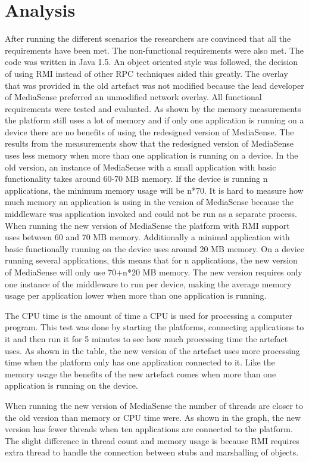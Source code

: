 \section{Analysis}
After running the different scenarios the researchers are convinced that all the requirements have been met. The non-functional requirements were also met. The code was written in Java 1.5. An object oriented style was followed, the decision of using RMI instead of other RPC techniques aided this greatly. The overlay that was provided in the old artefact was not modified because the lead developer of MediaSense preferred an unmodified network overlay. All functional requirements were tested and evaluated. As shown by the memory measurements the platform still uses a lot of memory and if only one application is running on a device there are no benefits of using the redesigned version of MediaSense. The results from the measurements show that the redesigned version of MediaSense uses less memory when more than one application is running on a device. In the old version, an instance of MediaSense with a small application with basic functionality takes around 60-70 MB memory. If the device is running n applications, the minimum memory usage will be n*70. It is hard to measure how much memory an application is using in the version of MediaSense because the middleware was application invoked and could not be run as a separate process. When running the new version of MediaSense the platform with RMI support uses between 60 and 70 MB memory. Additionally a minimal application with basic functionally running on the device uses around 20 MB memory. On a device running several applications, this means that for n applications, the new version of MediaSense will only use 70+n*20 MB memory. The new version requires only one instance of the middleware to run per device, making the average memory usage per application lower when more than one application is running.

The CPU time is the amount of time a CPU is used for processing a computer program. This test was done by starting the platforms, connecting applications to it and then run it for 5 minutes to see how much processing time the artefact uses. As shown in the table, the new version of the artefact uses more processing time when the platform only has one application connected to it. Like the memory usage the benefits of the new artefact comes when more than one application is running on the device. 

When running the new version of MediaSense the number of threads are closer to the old version than memory or CPU time were. As shown in the graph, the new version has fewer threads when ten applications are connected to the platform. The slight difference in thread count and memory usage is because RMI requires extra thread to handle the connection between stubs and marshalling of objects. 

